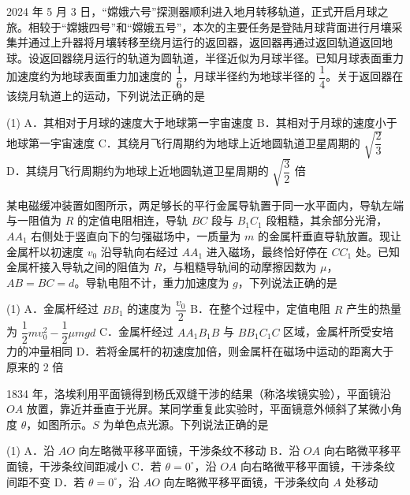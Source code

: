 \begin{question}
2024 年 5 月 3 日，“嫦娥六号”探测器顺利进入地月转移轨道，正式开启月球之旅。相较于“嫦娥四号”和“嫦娥五号”，本次的主要任务是登陆月球背面进行月壤采集并通过上升器将月壤转移至绕月运行的返回器，返回器再通过返回轨道返回地球。设返回器绕月运行的轨道为圆轨道，半径近似为月球半径。已知月球表面重力加速度约为地球表面重力加速度的 $\dfrac{1}{6}$，月球半径约为地球半径的 $\dfrac{1}{4}$。关于返回器在该绕月轨道上的运动，下列说法正确的是\gkblank

\begin{gkopts}(1)
  \task A．其相对于月球的速度大于地球第一宇宙速度
  \task B．其相对于月球的速度小于地球第一宇宙速度
  \task C．其绕月飞行周期约为地球上近地圆轨道卫星周期的 $\sqrt{\dfrac{2}{3}}$
  \task D．其绕月飞行周期约为地球上近地圆轨道卫星周期的 $\sqrt{\dfrac{3}{2}}$ 倍
\end{gkopts}
\end{question}

\begin{question}
某电磁缓冲装置如图所示，两足够长的平行金属导轨置于同一水平面内，导轨左端与一阻值为 $R$ 的定值电阻相连，导轨 $BC$ 段与 $B_{1}C_{1}$ 段粗糙，其余部分光滑，$AA_{1}$ 右侧处于竖直向下的匀强磁场中，一质量为 $m$ 的金属杆垂直导轨放置。现让金属杆以初速度 $v_{0}$ 沿导轨向右经过 $AA_{1}$ 进入磁场，最终恰好停在 $CC_{1}$ 处。已知金属杆接入导轨之间的阻值为 $R$，与粗糙导轨间的动摩擦因数为 $\mu$，$AB=BC=d$。导轨电阻不计，重力加速度为 $g$，下列说法正确的是\gkblank


\begin{gkopts}(1)
  \task A．金属杆经过 $BB_{1}$ 的速度为 $\dfrac{v_{0}}{2}$
  \task B．在整个过程中，定值电阻 $R$ 产生的热量为 $\dfrac{1}{2}mv_{0}^{2}-\dfrac{1}{2}\mu mgd$
  \task C．金属杆经过 $AA_{1}B_{1}B$ 与 $BB_{1}C_{1}C$ 区域，金属杆所受安培力的冲量相同
  \task D．若将金属杆的初速度加倍，则金属杆在磁场中运动的距离大于原来的 2 倍
\end{gkopts}
\end{question}

\begin{question}
1834 年，洛埃利用平面镜得到杨氏双缝干涉的结果（称洛埃镜实验），平面镜沿 $OA$ 放置，靠近并垂直于光屏。某同学重复此实验时，平面镜意外倾斜了某微小角度 $\theta$，如图所示。$S$ 为单色点光源。下列说法正确的是\gkblank


\begin{gkopts}(1)
  \task A．沿 $AO$ 向左略微平移平面镜，干涉条纹不移动
  \task B．沿 $OA$ 向右略微平移平面镜，干涉条纹间距减小
  \task C．若 $\theta=0^{\circ}$，沿 $OA$ 向右略微平移平面镜，干涉条纹间距不变
  \task D．若 $\theta=0^{\circ}$，沿 $AO$ 向左略微平移平面镜，干涉条纹向 $A$ 处移动
\end{gkopts}
\end{question}

